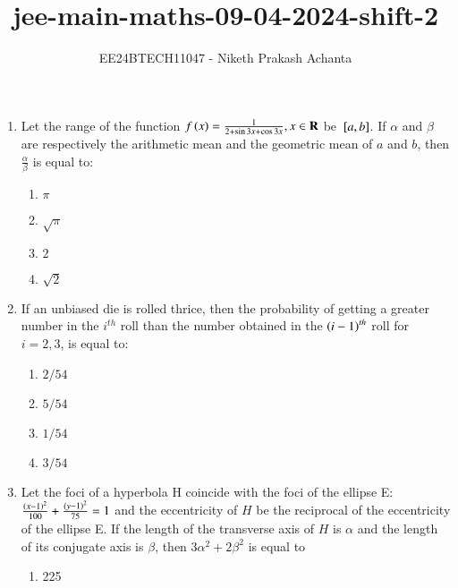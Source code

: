 \documentclass[journal]{IEEEtran}
\renewcommand{\thefigure}{\theenumi}
\renewcommand{\thetable}{\theenumi}
\numberwithin{equation}{enumi}
\numberwithin{figure}{enumi}
\renewcommand{\thetable}{\theenumi}
\begin{document}

\vspace{3cm}

\title{jee-main-maths-09-04-2024-shift-2}
\author{EE24BTECH11047 - Niketh Prakash Achanta}
{\let\newpage\relax\maketitle}
\renewcommand{\thefigure}{\theenumi}
\renewcommand{\thetable}{\theenumi}

\begin{enumerate}

    \item Let the range of the function $f\left(x\right)=\frac{1}{2+\sin{3x}+\cos{3x}},x\in\mathbf{R}$ be ${}\left[a, b\right]$. If $\alpha$ and $\beta$ are respectively the arithmetic mean and the geometric mean of $a$ and $b$, then $\frac{\alpha}{\beta}$ is equal to:
    \begin{enumerate}
        \item $\pi$
        \item $\sqrt{\pi}$
        \item $2$
        \item $\sqrt{2}$
    \end{enumerate}
    \item If an unbiased die is rolled thrice, then the probability of getting a greater number in the $i^{th}$ roll than the number obtained in the $\left(i-1\right)^{th}$ roll for $i = 2, 3$, is equal to:
    \begin{enumerate}
        \item $2/54$
        \item $5/54$
        \item $1/54$
        \item $3/54$
    \end{enumerate}
    \item Let the foci of a hyperbola H coincide with the foci of the ellipse E:$\frac{\left(x-1\right)^2}{100} + \frac{\left(y-1\right)^2}{75} = 1$ and the eccentricity of $H$ be the reciprocal of the eccentricity of the ellipse E. If the length of the transverse axis of $H$ is $\alpha$ and the length of its conjugate axis is $\beta$, then $3\alpha^2 + 2\beta^2$ is equal to
    \begin{enumerate}
        \item 225

\end{enumerate}
\end{enumerate}
\end{document}

